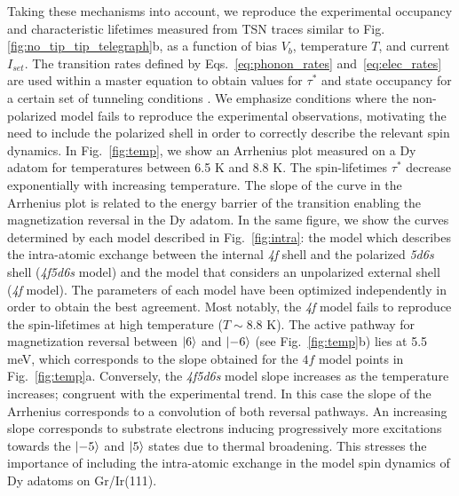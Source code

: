 \documentclass[
reprint,amsmath,amssymb,aps]{revtex4-2}
\begin{document}
Taking these mechanisms into account, we reproduce the experimental occupancy and characteristic lifetimes measured from TSN traces similar to Fig. \ref{fig:no_tip_tip_telegraph}b, as a function of bias $V_{b}$, temperature $T$, and current $I_{set}$. The transition rates defined by Eqs.~\ref{eq:phonon_rates} and~\ref{eq:elec_rates} are used within a master equation to obtain values for $\tau^*$ and state occupancy for a certain set of tunneling conditions \cite{delgado2010,Khajetoorians2013,loth2010,cervetti2016}. We emphasize conditions where the non-polarized model fails to reproduce the experimental observations, motivating the need to include the polarized shell in order to correctly describe the relevant spin dynamics.
In Fig.~\ref{fig:temp}, we show an Arrhenius plot measured on a Dy adatom for temperatures between 6.5 K and 8.8 K. The spin-lifetimes $\tau^*$ decrease exponentially with increasing temperature. The slope of the curve in the Arrhenius plot is related to the energy barrier of the transition enabling the magnetization reversal in the Dy adatom. In the same figure, we show the curves determined by each model described in Fig.~\ref{fig:intra}: the model which describes the intra-atomic exchange between the internal \textit{4f} shell and the polarized \textit{5d6s} shell (\textit{4f5d6s} model) and the model that considers an unpolarized external shell (\textit{4f} model). The parameters of each model have been optimized independently in order to obtain the best agreement. Most notably, the \textit{4f} model fails to reproduce the spin-lifetimes at high temperature ($T\sim 8.8$ K). The active pathway for magnetization reversal between $\ket{6}$ and $\ket{-6}$ (see Fig.~\ref{fig:temp}b) lies at 5.5 meV, which corresponds to the slope obtained for the $4f$ model points in Fig.~\ref{fig:temp}a. Conversely, the \textit{4f5d6s} model slope increases as the temperature increases; congruent with the experimental trend. In this case the slope of the Arrhenius corresponds to a convolution of both reversal pathways. An increasing slope corresponds to substrate electrons inducing progressively more excitations towards the $\ket{-5}$ and $\ket{5}$ states due to thermal broadening. This stresses the importance of including the intra-atomic exchange in the model spin dynamics of Dy adatoms on Gr/Ir(111).
\end{document}
